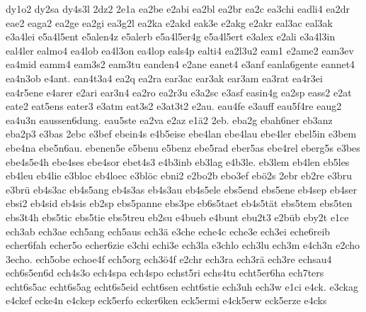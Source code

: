 {    dy1o2
    dy2sa
    dy4s3l
    2dz2
    2e1a
    ea2be
    e2abi
    ea2bl
    ea2br
    ea2c
    ea3chi
    eadli4
    ea2dr
    eae2
    eaga2
    ea2ge
    ea2gi
    ea3g2l
    ea2ka
    e2akd
    eak3e
    e2akg
    e2akr
    eal3ac
    eal3ak
    e3a4lei
    e5a4l5ent
    e5alen4z
    e5alerb
    e5a4l5er4g
    e5a4l5ert
    e3alex
    e2ali
    e3a4l3in
    eal4ler
    ealmo4
    ea4lob
    ea4l3on
    ea4lop
    eals4p
    ealti4
    ea2l3u2
    eam1
    e2ame2
    eam3ev
    ea4mid
    eamm4
    eam3s2
    eam3tu
    eanden4
    e2ane
    eanet4
    e3anf
    eanla6gente
    eannet4
    ea4n3ob
    e4ant.
    ean4t3a4
    ea2q
    ea2ra
    ear3ac
    ear3ak
    ear3am
    ea3rat
    ea4r3ei
    ea4r5ene
    e4arer
    e2ari
    ear3n4
    ea2ro
    ea2r3u
    e3a2sc
    e3asf
    easin4g
    ea2sp
    eass2
    e2at
    eate2
    eat5ens
    eater3
    e3atm
    eat3s2
    e3at3t2
    e2au.
    eau4fe
    e3auff
    eau5f4re
    eaug2
    ea4u3n
    eaussen6dung.
    eau5ste
    ea2va
    e2az
    e1ä2
    2eb.
    eba2g
    ebah6ner
    eb3anz
    eba2p3
    e3bas
    2ebc
    e3bef
    ebein4s
    e4b5eise
    ebe4lan
    ebe4lau
    ebe4ler
    ebel5in
    e3bem
    ebe4na
    ebe5n6au.
    ebenen5e
    e5benu
    e5benz
    ebe5rad
    eber5as
    ebe4rel
    eberg5s
    e3bes
    ebe4s5e4h
    ebe4ses
    ebe4sor
    ebet4s3
    e4b3inb
    eb3lag
    e4b3le.
    eb3lem
    eb4len
    eb5les
    eb4leu
    eb4lie
    e3bloc
    eb4loec
    e3blöc
    ebni2
    e2bo2b
    ebo3ef
    ebö2s
    2ebr
    eb2re
    e3bru
    e3brü
    eb4s3ac
    eb4s5ang
    eb4s3as
    eb4s3au
    eb4s5ele
    ebs5end
    ebs5ene
    eb4sep
    eb4ser
    ebsi2
    eb4sid
    eb4sis
    eb2sp
    ebs5panne
    ebs3pe
    eb6s5taet
    eb4s5tät
    ebs5tem
    ebs5ten
    ebs3t4h
    ebs5tic
    ebs5tie
    ebs5treu
    eb2su
    e4bueb
    e4bunt
    ebu2t3
    e2büb
    eby2t
    e1ce
    ech3ab
    ech3ae
    ech5ang
    ech5aus
    ech3ä
    e3che
    eche4c
    eche3e
    ech3ei
    eche6reib
    echer6fah
    echer5o
    echer6zie
    e3chi
    echi3e
    ech3la
    e3chlo
    ech3lu
    ech3m
    e4ch3n
    e2cho
    3echo.
    ech5obe
    echoe4f
    ech5org
    ech3ö4f
    e2chr
    ech3ra
    ech3rä
    ech3re
    echsau4
    ech6s5en6d
    ech4s3o
    ech4spa
    ech4spo
    echst5ri
    echs4tu
    echt5er6ha
    ech7ters
    echt6s5ac
    echt6s5ag
    echt6s5eid
    echt6sen
    echt6stie
    ech3uh
    ech3w
    e1ci
    e4ck.
    e3ckag
    e4ckef
    ecke4n
    e4ckep
    eck5erfo
    ecker6ken
    eck5ermi
    e4ck5erw
    eck5erze
    e4cks
}
